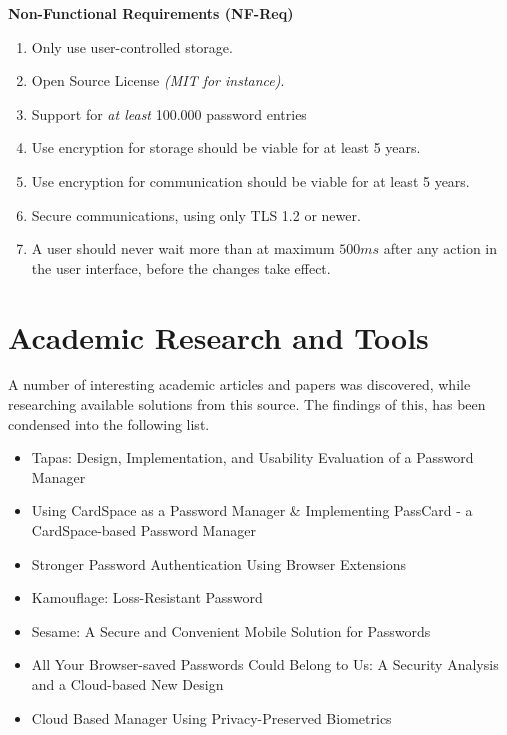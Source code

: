 				\textbf{Non-Functional Requirements (NF-Req)}
					\vspace{-3ex}\begin{enumerate}
						\setlength\itemsep{0.1em}
						\item Only use user-controlled storage.\label{item:user_storage}
						\item Open Source License \emph{(MIT for instance)}. \label{item:open-source}
						\item Support for \emph{at least} 100.000 password entries \label{item:entries}
						\item Use encryption for storage should be viable for at least 5 years. \label{item:encryption}
						\item Use encryption for communication should be viable for at least 5 years. \label{item:comms}
						\item Secure communications, using only TLS 1.2 or newer. \label{item:tls1.2}
						\item A user should never wait more than at maximum $500ms$ after any action in the user interface, before the changes take effect. \label{item:delay}
					\end{enumerate}

				
	
	\section{Academic Research and Tools}
		A number of interesting academic articles and papers was discovered, while researching available solutions from this source. The findings of this, has been condensed into the following list.

		\begin{itemize}
			\item Tapas: Design, Implementation, and Usability Evaluation of a Password Manager \cite{tapas}
			\item Using CardSpace as a Password Manager \& Implementing PassCard - a CardSpace-based Password Manager \cite{cardspace,cardspace_impl}
			\item Stronger Password Authentication Using Browser Extensions
			\item Kamouflage: Loss-Resistant Password
			\item Sesame: A Secure and Convenient Mobile Solution for Passwords
			\item All Your Browser-saved Passwords Could Belong to Us: A Security Analysis and a Cloud-based New Design
			\item Cloud Based Manager Using Privacy-Preserved Biometrics
		\end{itemize}
		

